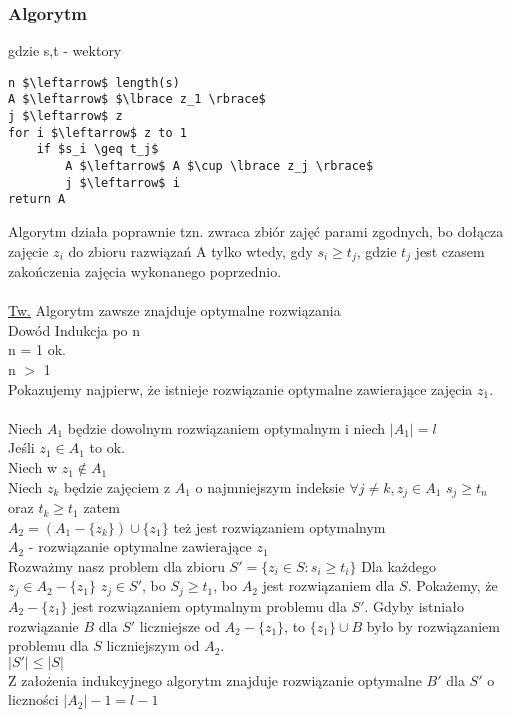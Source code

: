 \subsubsection{Algorytm}
gdzie s,t - wektory
\begin{lstlisting}
n $\leftarrow$ length(s)
A $\leftarrow$ $\lbrace z_1 \rbrace$
j $\leftarrow$ z
for i $\leftarrow$ z to 1
	if $s_i \geq t_j$ 
    	A $\leftarrow$ A $\cup \lbrace z_j \rbrace$
    	j $\leftarrow$ i
return A
\end{lstlisting}
Algorytm działa poprawnie tzn. zwraca zbiór zajęć parami zgodnych, bo dołącza zajęcie $z_i$ do zbioru razwiązań A tylko wtedy, gdy $s_i \geq t_j$, gdzie $t_j$ jest czasem zakończenia zajęcia wykonanego poprzednio.\\
\\
\underline{Tw.} Algorytm zawsze znajduje optymalne rozwiązania\\
Dowód Indukcja po n\\
\tab n = 1 ok.\\
\tab n $>$ 1\\
Pokazujemy najpierw, że istnieje rozwiązanie optymalne zawierające zajęcia $z_1$.\\
\\
Niech $A_1$ będzie dowolnym rozwiązaniem optymalnym i niech $\vert A_1\vert = l$\\
Jeśli $z_1 \in A_1$ to ok. \\
Niech w $z_1 \not\in A_1$ \\
Niech $z_k$ będzie zajęciem z $A_1$ o najmniejszym indeksie $\forall{j} \neq k, z_j \in A_1$ $s_j \geq t_n$ oraz $t_k \geq t_1$ zatem \\
$A_2 = (A_1 - \lbrace z_k\rbrace ) \cup \lbrace z_1 \rbrace $ też jest rozwiązaniem optymalnym \\
$A_2$ - rozwiązanie optymalne zawierające $z_1$\\
Rozważmy nasz problem dla zbioru $S' = \lbrace z_i \in S: s_i \geq t_i \rbrace$ Dla każdego $z_j \in A_2 - \lbrace z_1 \rbrace$ $z_j \in S'$, bo $S_j \geq t_1$, bo $A_2$ jest rozwiązaniem dla $S$. Pokażemy, że $A_2 - \lbrace z_1 \rbrace$ jest rozwiązaniem optymalnym problemu dla $S'$. Gdyby istniało rozwiązanie $B$ dla $S'$ liczniejsze od $A_2 - \lbrace z_1 \rbrace$, to $\lbrace z_1 \rbrace \cup B$ było by rozwiązaniem problemu dla $S$ liczniejszym od $A_2$. \\
$\vert S' \vert \leq \vert S \vert$\\
Z założenia indukcyjnego algorytm znajduje rozwiązanie optymalne $B'$ dla $S'$ o liczności $\vert A_2 \vert - 1 = l - 1$\\
